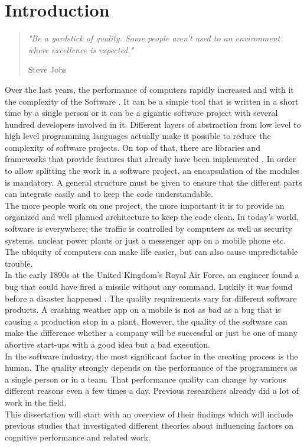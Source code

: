 \chapter{Introduction}

\begin{quote}
\centering 
\em %
"Be a yardstick of quality. Some people aren't used to an environment where excellence is expected."

\medskip
\raggedleft
Steve Jobs
\end{quote}
\vspace{10 mm}

Over the last years, the performance of computers rapidly increased and with it the complexity of the Software \cite{wirth2008brief}.
It can be a simple tool that is written in a short time by a single person or it can be a gigantic software project with several hundred developers involved in it\cite{cusumano1997microsoft}.
Different layers of abstraction from low level to high level programming languages actually make it possible to reduce the complexity of software projects. On top of that, there are libraries and frameworks that provide features that already have been implemented \cite{Martin:2008:CCH:1388398}.
In order to allow splitting the work in a software project, an encapsulation of the modules is mandatory. A general structure must be given to ensure that the different parts can integrate easily and to keep the code understandable.\\
The more people work on one project, the more important it is to provide an organized and well planned architecture to keep the code clean.
\bigbreak
In today's world, software is everywhere; the traffic is controlled by computers as well as security systems, nuclear power plants or just a messenger app on a mobile phone etc. \\
The ubiquity of computers can make life easier, but can also cause unpredictable trouble.\\
In the early 1890s at the United Kingdom's Royal Air Force, an engineer found a bug that could have fired a missile without any command. Luckily it was found before a disaster happened \cite{ross2005exterminators}.
\bigbreak
The quality requirements vary for different software products. A crashing weather app on a mobile is not as bad as a bug that is causing a production stop in a plant. 
However, the quality of the software can make the difference whether a company will be successful or just be one of many abortive start-ups with a good idea but a bad execution.
\\
In the software industry, the most significant factor in the creating process is the human. The quality strongly depends on the performance of the programmers as a single person or in a team. That performance quality can change by various different reasons even a few times a day.
\bigbreak 
Previous researchers already did a lot of work in the field. \\
This dissertation will start with an overview of their findings which will include previous studies that investigated different theories about influencing factors on cognitive performance and related work.

